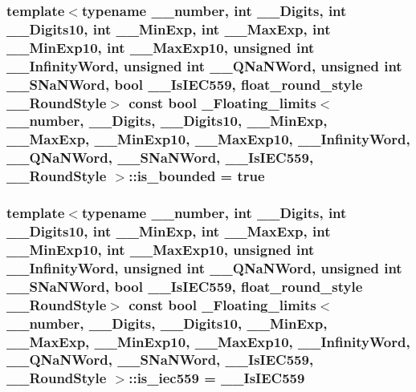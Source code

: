\subsubsection[{is\+\_\+bounded}]{\setlength{\rightskip}{0pt plus 5cm}template$<$typename \+\_\+\+\_\+number, int \+\_\+\+\_\+\+Digits, int \+\_\+\+\_\+\+Digits10, int \+\_\+\+\_\+\+Min\+Exp, int \+\_\+\+\_\+\+Max\+Exp, int \+\_\+\+\_\+\+Min\+Exp10, int \+\_\+\+\_\+\+Max\+Exp10, unsigned int \+\_\+\+\_\+\+Infinity\+Word, unsigned int \+\_\+\+\_\+\+Q\+Na\+N\+Word, unsigned int \+\_\+\+\_\+\+S\+Na\+N\+Word, bool \+\_\+\+\_\+\+Is\+I\+E\+C559, float\+\_\+round\+\_\+style \+\_\+\+\_\+\+Round\+Style$>$ const {\bf bool} {\bf \+\_\+\+Floating\+\_\+limits}$<$ \+\_\+\+\_\+number, \+\_\+\+\_\+\+Digits, \+\_\+\+\_\+\+Digits10, \+\_\+\+\_\+\+Min\+Exp, \+\_\+\+\_\+\+Max\+Exp, \+\_\+\+\_\+\+Min\+Exp10, \+\_\+\+\_\+\+Max\+Exp10, \+\_\+\+\_\+\+Infinity\+Word, \+\_\+\+\_\+\+Q\+Na\+N\+Word, \+\_\+\+\_\+\+S\+Na\+N\+Word, \+\_\+\+\_\+\+Is\+I\+E\+C559, \+\_\+\+\_\+\+Round\+Style $>$\+::is\+\_\+bounded = {\bf true}\hspace{0.3cm}{\ttfamily [static]}}\label{class__Floating__limits_ae1ea549d1fdb02edf5d8d2d5b0856991}
\hypertarget{class__Floating__limits_aea8a035d0d9e19732abd0e2cf90ffcea}{}
\subsubsection[{is\+\_\+iec559}]{\setlength{\rightskip}{0pt plus 5cm}template$<$typename \+\_\+\+\_\+number, int \+\_\+\+\_\+\+Digits, int \+\_\+\+\_\+\+Digits10, int \+\_\+\+\_\+\+Min\+Exp, int \+\_\+\+\_\+\+Max\+Exp, int \+\_\+\+\_\+\+Min\+Exp10, int \+\_\+\+\_\+\+Max\+Exp10, unsigned int \+\_\+\+\_\+\+Infinity\+Word, unsigned int \+\_\+\+\_\+\+Q\+Na\+N\+Word, unsigned int \+\_\+\+\_\+\+S\+Na\+N\+Word, bool \+\_\+\+\_\+\+Is\+I\+E\+C559, float\+\_\+round\+\_\+style \+\_\+\+\_\+\+Round\+Style$>$ const {\bf bool} {\bf \+\_\+\+Floating\+\_\+limits}$<$ \+\_\+\+\_\+number, \+\_\+\+\_\+\+Digits, \+\_\+\+\_\+\+Digits10, \+\_\+\+\_\+\+Min\+Exp, \+\_\+\+\_\+\+Max\+Exp, \+\_\+\+\_\+\+Min\+Exp10, \+\_\+\+\_\+\+Max\+Exp10, \+\_\+\+\_\+\+Infinity\+Word, \+\_\+\+\_\+\+Q\+Na\+N\+Word, \+\_\+\+\_\+\+S\+Na\+N\+Word, \+\_\+\+\_\+\+Is\+I\+E\+C559, \+\_\+\+\_\+\+Round\+Style $>$\+::is\+\_\+iec559 = \+\_\+\+\_\+\+Is\+I\+E\+C559\hspace{0.3cm}{\ttfamily [static]}}\label{class__Floating__limits_aea8a035d0d9e19732abd0e2cf90ffcea}
\hypertarget{class__Floating__limits_a1e78ab62e60c0d9faef1d3df89da9682}{}
